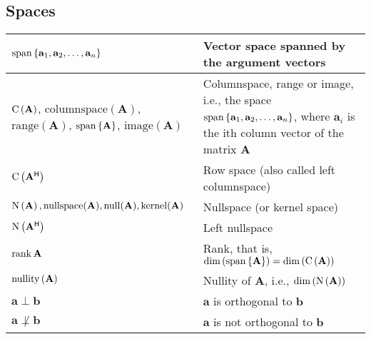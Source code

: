\documentclass{article}
\begin{document}
\subsection{Spaces}
\begin{xltabular}{\textwidth}{XX}
    \(\operatorname{span}\left\{\mathbf{a}_1, \mathbf{a}_2, \dots, \mathbf{a}_n\right\}\) & Vector space spanned by the argument vectors \cite{golubMatrixComputations2013}\\ \hline
    \(\operatorname{C}\left(\mathbf{A}\right)\), \(\mathrm{columnspace}(\mathbf{A})\), \(\mathrm{range}(\mathbf{A})\), \(\operatorname{span}\left\{\mathbf{A}\right\}\), \(\mathrm{image}(\mathbf{A})\) & Columnspace, range or image, i.e., the space \(\operatorname{span}\left\{\mathbf{a}_1,\mathbf{a}_2, \dots, \mathbf{a}_n\right\}\), where \(\mathbf{a}_i\) is the ith column vector of the matrix \(\mathbf{A}\) \cite{strangIntroductionLinearAlgebra1993, nossekAdaptiveArraySignal2015}\\ \hline
    \(\operatorname{C}\left(\mathbf{A}^\mathsf{H}\right)\) & Row space (also called left columnspace) \cite{strangIntroductionLinearAlgebra1993, nossekAdaptiveArraySignal2015}\\ \hline
    \(\operatorname{N}\left(\mathbf{A}\right), \mathrm{nullspace}(\mathbf{A}), \mathrm{null}(\mathbf{A}), \mathrm{kernel}(\mathbf{A})\) & Nullspace (or kernel space) \cite{strangIntroductionLinearAlgebra1993, nossekAdaptiveArraySignal2015,theodoridisMachineLearningBayesian2020}\\ \hline
    \(\operatorname{N}\left(\mathbf{A^\mathsf{H}}\right)\) & Left nullspace\\ \hline
    \(\rank{\mathbf{A}}\) & Rank, that is, \(\operatorname{dim}\left(\operatorname{span}\left\{\mathbf{A}\right\}\right) = \operatorname{dim}\left(\operatorname{C}\left(\mathbf{A}\right)\right)\) \cite{nossekAdaptiveArraySignal2015} \\ \hline
    \(\operatorname{nullity}\left(\mathbf{A}\right)\) & Nullity of \(\mathbf{A}\), i.e., \(\operatorname{dim}\left(\operatorname{N}\left(\mathbf{A}\right)\right)\)\\ \hline
    \(\mathbf{a} \perp \mathbf{b}\) & \(\mathbf{a}\) is orthogonal to \(\mathbf{b}\)\\ \hline
    \(\mathbf{a} \not\perp \mathbf{b}\) & \(\mathbf{a}\) is not orthogonal to \(\mathbf{b}\)\\
\end{xltabular}
\end{document}
